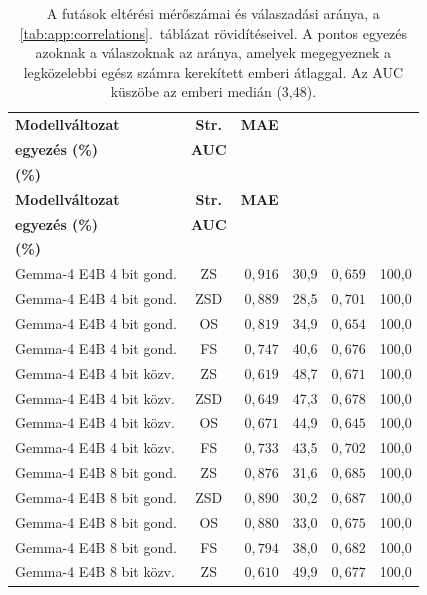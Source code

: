 \documentclass[
]{elteikthesis}[2024/04/26]
\begin{document}
\begin{longtable}{ | l | c | r | r | r | r | }
	\caption[A futások eltérési mérőszámai]{A futások eltérési mérőszámai és válaszadási aránya, a
	\ref{tab:app:correlations}.~táblázat rövidítéseivel.
	A pontos egyezés azoknak a válaszoknak az aránya, amelyek megegyeznek a legközelebbi egész számra kerekített emberi átlaggal.
	Az AUC küszöbe az emberi medián (3,48).}
	\label{tab:app:errors} \\
	\hline
	\textbf{Modellváltozat} & \textbf{Str.} & \textbf{MAE} & \makecell{\textbf{Pontos}\\\textbf{egyezés (\%)}} &
	\textbf{AUC} & \makecell{\textbf{Válasz}\\\textbf{(\%)}} \\
	\hline \hline
	\endfirsthead
	\hline
	\textbf{Modellváltozat} & \textbf{Str.} & \textbf{MAE} & \makecell{\textbf{Pontos}\\\textbf{egyezés (\%)}} &
	\textbf{AUC} & \makecell{\textbf{Válasz}\\\textbf{(\%)}} \\
	\hline \hline
	\endhead
	Gemma-4 E4B 4 bit gond. & ZS & $0{,}916$ & 30,9 & $0{,}659$ & 100,0 \\
	\hline
	Gemma-4 E4B 4 bit gond. & ZSD & $0{,}889$ & 28,5 & $0{,}701$ & 100,0 \\
	\hline
	Gemma-4 E4B 4 bit gond. & OS & $0{,}819$ & 34,9 & $0{,}654$ & 100,0 \\
	\hline
	Gemma-4 E4B 4 bit gond. & FS & $0{,}747$ & 40,6 & $0{,}676$ & 100,0 \\
	\hline
	Gemma-4 E4B 4 bit közv. & ZS & $0{,}619$ & 48,7 & $0{,}671$ & 100,0 \\
	\hline
	Gemma-4 E4B 4 bit közv. & ZSD & $0{,}649$ & 47,3 & $0{,}678$ & 100,0 \\
	\hline
	Gemma-4 E4B 4 bit közv. & OS & $0{,}671$ & 44,9 & $0{,}645$ & 100,0 \\
	\hline
	Gemma-4 E4B 4 bit közv. & FS & $0{,}733$ & 43,5 & $0{,}702$ & 100,0 \\
	\hline
	Gemma-4 E4B 8 bit gond. & ZS & $0{,}876$ & 31,6 & $0{,}685$ & 100,0 \\
	\hline
	Gemma-4 E4B 8 bit gond. & ZSD & $0{,}890$ & 30,2 & $0{,}687$ & 100,0 \\
	\hline
	Gemma-4 E4B 8 bit gond. & OS & $0{,}880$ & 33,0 & $0{,}675$ & 100,0 \\
	\hline
	Gemma-4 E4B 8 bit gond. & FS & $0{,}794$ & 38,0 & $0{,}682$ & 100,0 \\
	\hline
	Gemma-4 E4B 8 bit közv. & ZS & $0{,}610$ & 49,9 & $0{,}677$ & 100,0 \\

\end{longtable}
\end{document}
